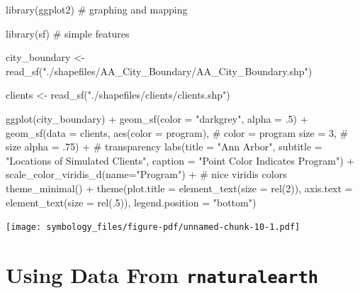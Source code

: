 \documentclass[
  letterpaper,
  DIV=11,
  numbers=noendperiod,
  oneside]{scrreprt}
\newenvironment{Shaded}{\begin{snugshade}}{\end{snugshade}}
\newcommand{\AttributeTok}[1]{\textcolor[rgb]{0.40,0.45,0.13}{#1}}
\newcommand{\CommentTok}[1]{\textcolor[rgb]{0.37,0.37,0.37}{#1}}
\newcommand{\DecValTok}[1]{\textcolor[rgb]{0.68,0.00,0.00}{#1}}
\newcommand{\FunctionTok}[1]{\textcolor[rgb]{0.28,0.35,0.67}{#1}}
\newcommand{\NormalTok}[1]{\textcolor[rgb]{0.00,0.23,0.31}{#1}}
\newcommand{\OtherTok}[1]{\textcolor[rgb]{0.00,0.23,0.31}{#1}}
\newcommand{\SpecialCharTok}[1]{\textcolor[rgb]{0.37,0.37,0.37}{#1}}
\newcommand{\StringTok}[1]{\textcolor[rgb]{0.13,0.47,0.30}{#1}}
\begin{document}
\begin{Shaded}
\begin{Highlighting}[]
\FunctionTok{library}\NormalTok{(ggplot2) }\CommentTok{\# graphing and mapping}

\FunctionTok{library}\NormalTok{(sf) }\CommentTok{\# simple features}

\NormalTok{city\_boundary }\OtherTok{\textless{}{-}} \FunctionTok{read\_sf}\NormalTok{(}\StringTok{"./shapefiles/AA\_City\_Boundary/AA\_City\_Boundary.shp"}\NormalTok{)}

\NormalTok{clients }\OtherTok{\textless{}{-}} \FunctionTok{read\_sf}\NormalTok{(}\StringTok{"./shapefiles/clients/clients.shp"}\NormalTok{)}

\FunctionTok{ggplot}\NormalTok{(city\_boundary) }\SpecialCharTok{+}
  \FunctionTok{geom\_sf}\NormalTok{(}\AttributeTok{color =} \StringTok{"darkgrey"}\NormalTok{, }\AttributeTok{alpha =}\NormalTok{ .}\DecValTok{5}\NormalTok{) }\SpecialCharTok{+}
  \FunctionTok{geom\_sf}\NormalTok{(}\AttributeTok{data =}\NormalTok{ clients,}
          \FunctionTok{aes}\NormalTok{(}\AttributeTok{color =}\NormalTok{ program), }\CommentTok{\# color = program}
          \AttributeTok{size =} \DecValTok{3}\NormalTok{, }\CommentTok{\# size}
          \AttributeTok{alpha =}\NormalTok{ .}\DecValTok{75}\NormalTok{) }\SpecialCharTok{+} \CommentTok{\# transparency}
  \FunctionTok{labs}\NormalTok{(}\AttributeTok{title =} \StringTok{"Ann Arbor"}\NormalTok{,}
       \AttributeTok{subtitle =} \StringTok{"Locations of Simulated Clients"}\NormalTok{,}
       \AttributeTok{caption =} \StringTok{"Point Color Indicates Program"}\NormalTok{) }\SpecialCharTok{+}
  \FunctionTok{scale\_color\_viridis\_d}\NormalTok{(}\AttributeTok{name=}\StringTok{"Program"}\NormalTok{) }\SpecialCharTok{+} \CommentTok{\# nice viridis colors}
  \FunctionTok{theme\_minimal}\NormalTok{() }\SpecialCharTok{+}
  \FunctionTok{theme}\NormalTok{(}\AttributeTok{plot.title =} \FunctionTok{element\_text}\NormalTok{(}\AttributeTok{size =} \FunctionTok{rel}\NormalTok{(}\DecValTok{2}\NormalTok{)), }
        \AttributeTok{axis.text =} \FunctionTok{element\_text}\NormalTok{(}\AttributeTok{size =} \FunctionTok{rel}\NormalTok{(.}\DecValTok{5}\NormalTok{)),}
        \AttributeTok{legend.position =} \StringTok{"bottom"}\NormalTok{) }
\end{Highlighting}
\end{Shaded}

\texttt{[image: symbology\_files/figure-pdf/unnamed-chunk-10-1.pdf]}

\chapter{\texorpdfstring{Using Data From
\texttt{rnaturalearth}}{Using Data From rnaturalearth}}\label{sec-rnaturalearth}
\end{document}
